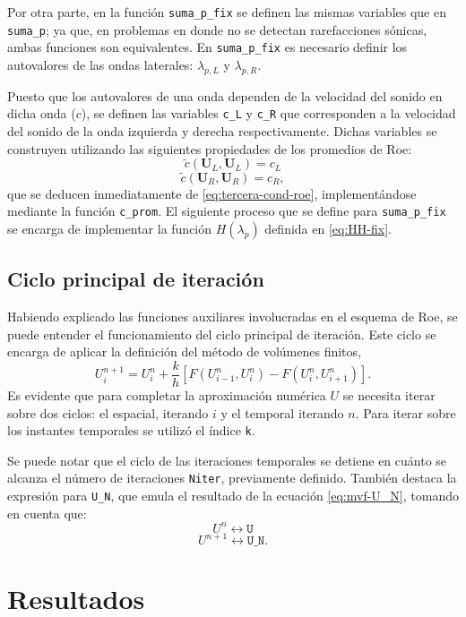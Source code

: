 Por otra parte, en la función \texttt{suma\_p\_fix} se definen las mismas variables que en \texttt{suma\_p}; ya que, en problemas en donde no se detectan rarefacciones sónicas, ambas funciones son equivalentes. En \texttt{suma\_p\_fix} es necesario definir los autovalores de las ondas laterales: $\lambda_{p,L}$ y $\lambda_{p,R}$.

Puesto que los autovalores de una onda dependen de la velocidad del sonido en dicha onda ($c$), se definen las variables \texttt{c\_L} y \texttt{c\_R} que corresponden a la velocidad del sonido de la onda izquierda y derecha respectivamente. Dichas variables se construyen utilizando las siguientes propiedades de los promedios de Roe:
\begin{equation}
	\tilde{c}(\mathbf{{U}}_L, \mathbf{{U}}_L) = c_L
\end{equation}
\begin{equation}
	\tilde{c}(\mathbf{{U}}_R, \mathbf{{U}}_R) = c_R,
\end{equation}
que se deducen inmediatamente de \ref{eq:tercera-cond-roe}, implementándose mediante la función \texttt{c\_prom}. El siguiente proceso que se define para \texttt{suma\_p\_fix} se encarga de implementar la función $H(\lambda_{p})$ definida en \eqref{eq:HH-fix}.


\subsection{Ciclo principal de iteración}
Habiendo explicado las funciones auxiliares involucradas en el esquema de Roe, se puede entender el funcionamiento del ciclo principal de iteración. Este ciclo se encarga de aplicar la definición del método de volúmenes finitos,
\begin{equation}
	U_{i}^{n+1} = U_{i}^{n} +
	\frac{k}{h}\left[ F(U_{i-1}^n, U_i^n) - F(U_{i}^n, U_{i+1}^n) \right].
	\label{eq:mvf-U_N}
\end{equation}
Es evidente que para completar la aproximación numérica $U$ se necesita iterar sobre dos ciclos: el espacial, iterando $i$ y el temporal iterando $n$. Para iterar sobre los instantes temporales se utilizó el índice \texttt{k}.

Se puede notar que el ciclo de las iteraciones temporales se detiene en cuánto se alcanza el número de iteraciones \texttt{Niter}, previamente definido. También destaca la expresión para \texttt{U\_N}, que emula el resultado de la ecuación \eqref{eq:mvf-U_N}, tomando en cuenta que:
\begin{equation}
	U^{n} \leftrightarrow \texttt{U}
\end{equation}
\begin{equation}
	U^{n+1} \leftrightarrow \texttt{U\_N}.
\end{equation}
\section{Resultados}

